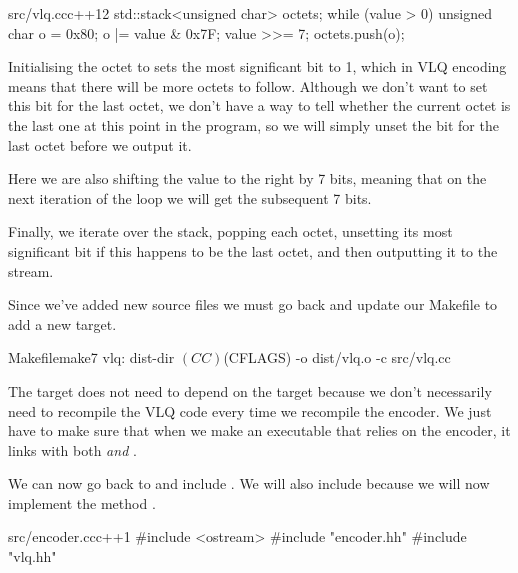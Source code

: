\begin{file}{src/vlq.cc}{c++}{12}
    std::stack<unsigned char> octets;
    while (value > 0)
    {
        unsigned char o = 0x80;
        o |= value & 0x7F;
        value >>= 7;
        octets.push(o);
    }
\end{file}

Initialising the octet to  sets the most significant bit to 1, which in VLQ encoding means that there will be more octets to follow. Although we don't want to set this bit for the last octet, we don't have a way to tell whether the current octet is the last one at this point in the program, so we will simply unset the bit for the last octet before we output it.

Here we are also shifting the value to the right by 7 bits, meaning that on the next iteration of the loop we will get the subsequent 7 bits.

Finally, we iterate over the stack, popping each octet, unsetting its most significant bit if this happens to be the last octet, and then outputting it to the stream.

\begin{file}{src/vlq.cc}{c++}{21}
    size_t size = octets.size();
    for (size_t i = 0; i < size; i++)
    {
        auto octet = octets.top();
        octets.pop();

        if (i == size - 1)
        {
            octet &= 0x7f;
        }

        os << octet;
    }
}
\end{file}

Since we've added new source files we must go back and update our Makefile to add a new target.

\begin{file}{Makefile}{make}{7}
vlq: dist-dir
	$(CC) $(CFLAGS) -o dist/vlq.o -c src/vlq.cc
\end{file}

The  target does not need to depend on the  target because we don't necessarily need to recompile the VLQ code every time we recompile the encoder. We just have to make sure that when we make an executable that relies on the encoder, it links with both  \textit{and} .

We can now go back to  and include . We will also include  because we will now implement the method .

\begin{file}{src/encoder.cc}{c++}{1}
#include <ostream>
#include "encoder.hh"
#include "vlq.hh"
\end{file}


